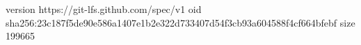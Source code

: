 version https://git-lfs.github.com/spec/v1
oid sha256:23c187f5de90e586a1407e1b2e322d733407d54f3cb93a604588f4cf664bfebf
size 199665
